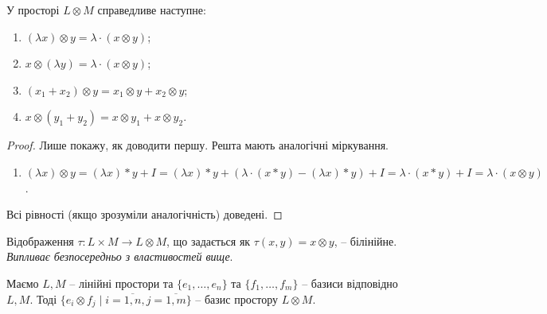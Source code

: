 \documentclass{math_library}
\begin{document}
\begin{proposition}
У просторі $L \otimes M$ справедливе наступне:
\begin{enumerate}[nosep,wide=0pt,label={\arabic*)}]
\item $(\lambda x) \otimes y = \lambda \cdot (x \otimes y)$;
\item $x \otimes (\lambda y) = \lambda \cdot (x \otimes y)$;
\item $(x_1 + x_2) \otimes y = x_1 \otimes y + x_2 \otimes y$;
\item $x \otimes (y_1 + y_2) = x \otimes y_1 + x \otimes y_2$.
\end{enumerate}
\end{proposition}

\begin{proof}
Лише покажу, як доводити першу. Решта мають аналогічні міркування.
\begin{enumerate}[wide=0pt,label={\arabic*)}]
\item $(\lambda x) \otimes y = (\lambda x)*y + I = (\lambda x)*y + (\lambda \cdot (x*y) - (\lambda x)*y) + I = \lambda \cdot (x*y) + I = \lambda \cdot (x \otimes y)$.
\end{enumerate}
Всі рівності (якщо зрозуміли аналогічність) доведені.
\end{proof}

\begin{lemma}
Відображення $\tau \colon L \times M \to L \otimes M$, що задається як $\tau(x,y) = x \otimes y$, -- білінійне.\\
\textit{Випливає безпосередньо з властивостей вище}.
\end{lemma}

\begin{theorem}
Маємо $L,M$ -- лінійні простори та $\{e_1,\dots,e_n\}$ та $\{f_1,\dots,f_m\}$ -- базиси відповідно $L,M$. Тоді $\{ e_i \otimes f_j \mid i = \overline{1,n}, j = \overline{1,m} \}$ -- базис простору $L \otimes M$.
\end{theorem}
\end{document}
